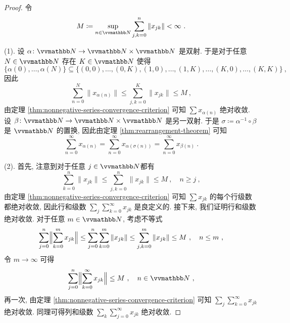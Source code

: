 \begin{proof}
    令
    \[
        M \coloneqq \sup_{n \in \N} \sum_{j, k = 0}^n \|x_{j k}\| < \infty\ .
    \]

    (1). 设 \(\alpha \colon \N \to \N \times \N\) 是双射. 于是对于任意 \(N \in \N\) 存在 \(K \in \N\) 使得
    \[
        \bigl\{ \alpha(0), \ldots, \alpha(N) \bigr\} \subseteq \bigl\{ (0, 0), \ldots, (0, K), (1, 0), \ldots, (1, K), \ldots, (K, 0), \ldots, (K, K) \bigr\}\ ,
    \]
    因此
    \[
        \sum_{n = 0}^N \|x_{\alpha(n)}\| \leq \sum_{j, k = 0}^K \|x_{j k}\| \leq M\ ,
    \]
    由定理 \ref{thm:nonnegative-series-convergence-criterion} 可知 \(\sum x_{\alpha(n)}\) 绝对收敛. 设 \(\beta \colon \N \to \N \times \N\) 是另一双射. 于是 \(\sigma \coloneqq \alpha^{- 1} \circ \beta\) 是 \(\N\) 的置换, 因此由定理 \ref{thm:rearrangement-theorem} 可知
    \[
        \sum_{n = 0}^\infty x_{\alpha(n)} = \sum_{n = 0}^\infty x_{\alpha(\sigma(n))} = \sum_{n = 0}^\infty x_{\beta(n)}\ .
    \]

    (2). 首先, 注意到对于任意 \(j \in \N\)都有
    \[
        \sum_{k = 0}^n \|x_{j k}\| \leq \sum_{j, k = 0}^n \|x_{j k}\| \leq M\ ,\quad n \geq j\ ,
    \]
    由定理 \ref{thm:nonnegative-series-convergence-criterion} 可知 \(\sum x_{j k}\) 的每个行级数都绝对收敛, 因此行和级数 \(\sum_j \sum_{k = 0}^\infty x_{j k}\) 是良定义的. 接下来, 我们证明行和级数绝对收敛. 对于任意 \(m \in \N\), 考虑不等式
    \[
        \sum_{j = 0}^n \Bigl\|\sum_{k = 0}^m x_{j k} \Bigr\| \leq \sum_{j = 0}^n \sum_{k = 0}^m \|x_{j k}\| \leq \sum_{j, k = 0}^m \|x_{j k}\| \leq M\ ,\quad n \leq m\ ,
    \]
    令 \(m \to \infty\) 可得
    \[
        \sum_{j = 0}^n \Bigl\|\sum_{k = 0}^\infty x_{j k} \Bigr\| \leq M\ ,\quad n \in \N\ ,
    \]
    再一次, 由定理 \ref{thm:nonnegative-series-convergence-criterion} 可知 \(\sum_j \sum_{k = 0}^\infty x_{j k}\) 绝对收敛. 同理可得列和级数 \(\sum_k \sum_{j = 0}^\infty x_{j k}\) 绝对收敛.


\end{proof}
